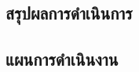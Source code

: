 \documentclass[11pt,a4paper]{article}
\begin{document}
\subsection{สรุปผลการดำเนินการ}

\subsection{แผนการดำเนินงาน}
\end{document}
